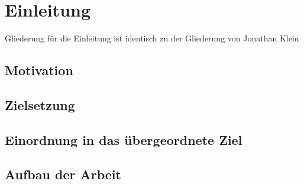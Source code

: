 \chapter{Einleitung} \label{cha:Einleitung}	
Gliederung für die Einleitung ist identisch zu der Gliederung von Jonathan Klein
\newline

\lipsum[1]

\section{Motivation}\label{sec:Motivation}

\lipsum[1]

\section{Zielsetzung}\label{sec:Zielsetzung}


\section{Einordnung in das übergeordnete Ziel}\label{sec:ÜbergeortnetesZiel}


\section{Aufbau der Arbeit}\label{sec:AufbauDerArbeit}


